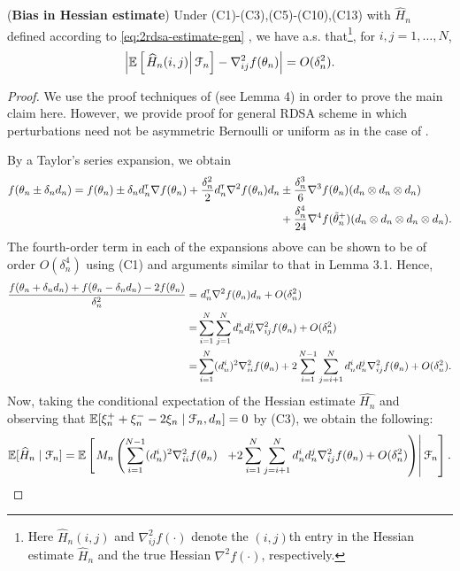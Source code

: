 \begin{lemma}(\textbf{Bias in Hessian estimate})
\label{lemma:2rdsa-bias}
Under (C1)-(C3),(C5)-(C10),(C13) with $\widehat H_n$ defined according to \eqref{eq:2rdsa-estimate-gen} , we have a.s. that\footnote{Here $\widehat H_n(i,j)$ and $\nabla^2_{ij}f(\cdot)$ denote the $(i,j)$th entry in the Hessian estimate $\widehat H_n$ and the true Hessian $\nabla^2 f(\cdot)$, respectively.}, for $i,j = 1,\ldots,N$,
\begin{align}
\left|\mathbb{E}\left[
\left. \widehat H_n(i,j) \right| \mathcal{F}_n \right] - \nabla^2_{ij} f(\theta_n)\right| = O(\delta_n^2).
\end{align} 
\end{lemma}
\begin{proof}
We use the proof techniques of \cite{prashanth2015rdsa} (see Lemma 4) in order to prove the main claim here. However, we provide proof for general RDSA scheme in which perturbations need not be asymmetric Bernoulli or uniform as in the case of \cite{prashanth2015rdsa}.

By a Taylor's series expansion, we obtain
\begin{align*}
f(\theta_n \pm \delta_n d_n) = f(\theta_n) \pm \delta_n d_n^\mathsf{\scriptscriptstyle T} \nabla f(\theta_n) + \frac{\delta_n^2}{2} d_n^\mathsf{\scriptscriptstyle T} \nabla^2 f(\theta_n) d_n &\pm \frac{\delta_n^3}{6} \nabla^3 f(\theta_n) (d_n \otimes d_n \otimes d_n) \\
 & +  \frac{\delta_n^4}{24} \nabla^4 f(\tilde  \theta_n^+)(d_n \otimes d_n \otimes d_n \otimes d_n).
\end{align*}
The fourth-order term in each of the expansions above can be shown to be of order $O(\delta_n^4)$ using (C1) and arguments similar to that in Lemma 3.1. Hence,
\begin{align*}
\dfrac{f(\theta_n+\delta_n d_n) + f(\theta_n-\delta_n d_n) - 2 f(\theta_n)}{\delta_n^2}
 = &\,\, d_n^\mathsf{\scriptscriptstyle T} \nabla^2 f(\theta_n) d_n +  O(\delta_n^2)\\
= & \sum\limits_{i=1}^N\sum\limits_{j=1}^N d_n^i d_n^j \nabla^2_{ij} f(\theta_n) + O(\delta_n^2)\\
= & \sum\limits_{i=1}^N (d_n^i)^2 \nabla^2_{ii} f(\theta_n) + 2\sum\limits_{i=1}^{N-1}\sum\limits_{j=i+1}^N d_n^i d_n^j \nabla^2_{ij} f(\theta_n) + O(\delta_n^2).
\end{align*}
Now, taking the conditional expectation of the Hessian estimate $\widehat{H_n}$ and observing that $\mathbb{E}[\xi_n^+ + \xi_n^- - 2\xi_n \mid \mathcal{F}_n, d_n] = 0$ by (C3), we obtain the following:
\begin{align}
\mathbb{E}[\widehat H_n \mid \mathcal{F}_n] =  \mathbb{E}\left[\left. M_n \left(\sum\limits_{i=1}^{N-1} (d_n^i)^2 \nabla^2_{ii} f(\theta_n) \right.\right.\right.\left.\left.\left.+ 2\sum\limits_{i=1}^N\sum\limits_{j=i+1}^N d_n^i d_n^j \nabla^2_{ij} f(\theta_n) + O(\delta_n^2)\right)\right| \mathcal{F}_n\right]. \label{eq:h1}
\end{align}


\end{proof}
